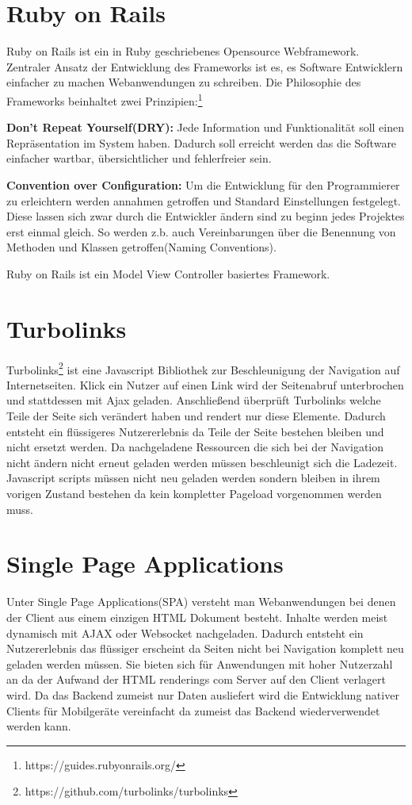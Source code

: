 \section{Ruby on Rails}
Ruby on Rails ist ein in Ruby geschriebenes Opensource Webframework. Zentraler Ansatz der Entwicklung des Frameworks ist es, es Software Entwicklern einfacher zu machen Webanwendungen zu schreiben. Die Philosophie des Frameworks beinhaltet zwei Prinzipien:\footnote{https://guides.rubyonrails.org/}

\textbf{Don't Repeat Yourself(DRY):}
Jede Information und Funktionalität soll einen Repräsentation im System haben. Dadurch soll erreicht werden das die Software einfacher wartbar, über­sicht­licher und fehlerfreier sein.
 
\textbf{Convention over Configuration:}
Um die Entwicklung für den Programmierer zu erleichtern werden annahmen getroffen und Standard Einstellungen festgelegt. Diese lassen sich zwar durch die Entwickler ändern sind zu beginn jedes Projektes erst einmal gleich. So werden z.b. auch Vereinbarungen über die Benennung von Methoden und Klassen getroffen(Naming Conventions).

Ruby on Rails ist ein Model View Controller basiertes Framework. 

\section{Turbolinks}
Turbolinks\footnote{https://github.com/turbolinks/turbolinks} ist eine Javascript Bibliothek zur Beschleunigung der Navigation auf Internetseiten. Klick ein Nutzer auf einen Link wird der Seitenabruf unterbrochen und stattdessen mit Ajax geladen. Anschließend überprüft Turbolinks welche Teile der Seite sich verändert haben und rendert nur diese Elemente. Dadurch entsteht ein flüssigeres Nutzererlebnis da Teile der Seite bestehen bleiben und nicht ersetzt werden. Da nachgeladene Ressourcen die sich bei der Navigation nicht ändern nicht erneut geladen werden müssen beschleunigt sich die Ladezeit. Javascript scripts müssen nicht neu geladen werden sondern bleiben in ihrem vorigen Zustand bestehen da kein kompletter Pageload vorgenommen werden muss.

\section{Single Page Applications}

Unter Single Page Applications(SPA) versteht man Webanwendungen bei denen der Client aus einem einzigen HTML Dokument besteht. Inhalte werden meist dynamisch mit AJAX oder Websocket nachgeladen. Dadurch entsteht ein Nutzererlebnis das flüssiger erscheint da Seiten nicht bei Navigation komplett neu geladen werden müssen. Sie bieten sich für Anwendungen mit hoher Nutzerzahl an da der Aufwand der HTML renderings com Server auf den Client verlagert wird. Da das Backend zumeist nur Daten ausliefert wird die Entwicklung nativer Clients für Mobilgeräte vereinfacht da zumeist das Backend wiederverwendet werden kann.

